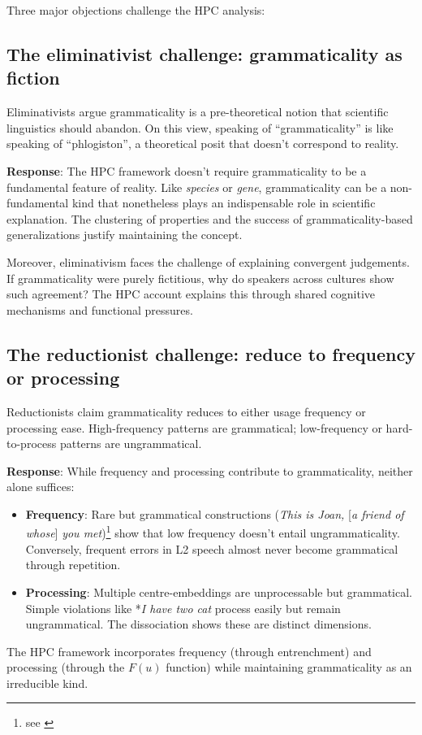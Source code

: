\documentclass[12pt]{article}
\begin{document}
Three major objections challenge the HPC analysis:

\subsection{The eliminativist challenge: grammaticality as fiction}

Eliminativists argue grammaticality is a pre-theoretical notion that scientific linguistics should abandon. On this view, speaking of \enquote{grammaticality} is like speaking of \enquote{phlogiston}, a theoretical posit that doesn't correspond to reality.

\textbf{Response}: The HPC framework doesn't require grammaticality to be a fundamental feature of reality. Like \textit{species} or \textit{gene}, grammaticality can be a non-fundamental kind that nonetheless plays an indispensable role in scientific explanation. The clustering of properties and the success of grammaticality-based generalizations justify maintaining the concept.

Moreover, eliminativism faces the challenge of explaining convergent judgements. If grammaticality were purely fictitious, why do speakers across cultures show such agreement? The HPC account explains this through shared cognitive mechanisms and functional pressures.

\subsection{The reductionist challenge: reduce to frequency or processing}

Reductionists claim grammaticality reduces to either usage frequency or processing ease. High-frequency patterns are grammatical; low-frequency or hard-to-process patterns are ungrammatical.

\textbf{Response}: While frequency and processing contribute to grammaticality, neither alone suffices:

\begin{itemize}
\item\textbf{Frequency}: Rare but grammatical constructions (\textit{This is Joan, }[\textit{a friend of whose}]\textit{ you met})\footnote{see \textcite{ReynoldsWhose}} show that low frequency doesn't entail ungrammaticality. Conversely, frequent errors in L2 speech almost never become grammatical through repetition.

\item\textbf{Processing}: Multiple centre-embeddings are unprocessable but grammatical. Simple violations like *\textit{I have two cat} process easily but remain ungrammatical. The dissociation shows these are distinct dimensions.
\end{itemize}
The HPC framework incorporates frequency (through entrenchment) and processing (through the $F(u)$ function) while maintaining grammaticality as an irreducible kind.
\end{document}
